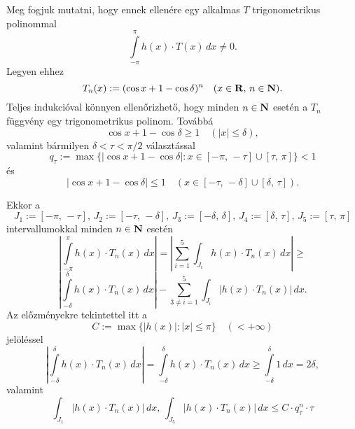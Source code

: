 Meg fogjuk mutatni, hogy ennek ellenére egy alkalmas $T$ trigonometrikus polinommal
\[
	\int\limits_{-\pi}^\pi h(x) \cdot T(x) \, dx \neq 0.
\]
Legyen ehhez
\[
	T_n(x) := (\cos x + 1 - \cos \delta)^n \quad (x \in \mathbf{R}, \, n \in \mathbf{N}).
\]
Teljes indukcióval könnyen ellenőrizhető, hogy minden $n \in \mathbf{N}$ esetén a $T_n$ függvény egy trigonometrikus polinom. Továbbá
\[
	\cos x + 1 - \cos \delta \geq 1 \quad (|x| \leq \delta),
\]
valamint bármilyen $\delta < \tau < \pi / 2$ választással
\[
	q_\tau := \max \{ |\cos x + 1 - \cos \delta| : x \in [-\pi, \, -\tau] \cup [\tau, \, \pi]\} < 1
\]
és
\[
	|\cos x + 1 - \cos \delta| \leq 1 \quad (x \in [-\tau, \, -\delta] \cup [\delta, \, \tau]).
\]

\begin{center}
\end{center}
Ekkor a
\[
	J_1 := [-\pi, \, -\tau], \, J_2 := [-\tau, \, -\delta], \, J_3 := [-\delta, \, \delta], \, J_4 := [\delta, \, \tau], \, J_5 := [\tau, \, \pi]
\]
intervallumokkal minden $n \in \mathbf{N}$ esetén
\[
	\left| \int\limits_{-\pi}^\pi h(x) \cdot T_n(x) \, dx \right| = \left| \sum_{i=1}^5 \int_{J_i} h(x) \cdot T_n(x) \, dx\right| \geq
\]
\[
	\left| \int\limits_{-\delta}^\delta h(x) \cdot T_n(x) \, dx \right| - \sum_{3 \neq i = 1}^5 \int_{J_i} |h(x) \cdot T_n(x)| \, dx.
\]
Az előzményekre tekintettel itt a
\[
	C := \max \big\{ |h(x)| : |x| \leq \pi \big\} \quad (< + \infty)
\]
jelöléssel
\[
	\left| \int\limits_{-\delta}^\delta h(x) \cdot T_n(x) \, dx \right| = \int\limits_{-\delta}^\delta h(x) \cdot T_n(x) \, dx \geq \int\limits_{-\delta}^\delta 1 \, dx = 2\delta,
\]
valamint
\[
	\int_{J_1} |h(x) \cdot T_n(x)| \, dx, \, \int_{J_5} |h(x) \cdot T_n(x)| \, dx \leq C \cdot q_\tau^n \cdot \tau
\]
